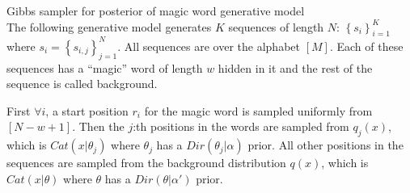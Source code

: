\documentclass[a4paper,twoside=false,abstract=false,numbers=noenddot,
titlepage=false,headings=small,parskip=half,version=last]{scrartcl}
\begin{document}
\begin{exercise}{3}Gibbs sampler for posterior of magic word generative model\\
    The following generative model generates $K$ sequences of length $N$:
    $\left\{s_i\right\}_{i=1}^K$ where $s_i=\left\{s_{i,j}\right\}_{j=1}^N$.
    All sequences are over the alphabet $\left[M\right]$. Each of these
    sequences has a ``magic'' word of length $w$ hidden in it and the rest of
    the sequence is called background.

    First $\forall i$, a start position $r_i$ for the magic word is sampled
    uniformly from $\left[N-w+1\right]$. Then the $j$:th positions in the words
    are sampled from $q_j(x)$, which is $Cat\left(x|\theta_j\right)$ where 
    $\theta_j$ has a $Dir\left(\theta_j|\alpha\right)$ prior. All other
    positions in the sequences are sampled from the background distribution
    $q(x)$, which is $Cat\left(x|\theta\right)$ where $\theta$ has a
    $Dir\left(\theta|\alpha'\right)$ prior.
\end{exercise}
\begin{solution}
    
\end{solution}
\end{document}
